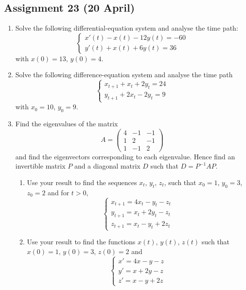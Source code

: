 \documentclass[a4paper]{article}
\begin{document}
\subsection*{Assignment 23 (20 April)}

\begin{enumerate}



\item Solve the following differential-equation system and analyse the time path:
\[
\begin{cases}
x'(t)-x(t)-12y(t)=-60 \\
y'(t)+x(t)+6y(t)=36
\end{cases}
\]
with $x(0)=13$, $y(0)=4$.

\item  Solve the following difference-equation system and analyse the time path
\[
\begin{cases}
x_{t+1}+x_t+2y_t=24 \\
y_{t+1}+2x_t-2y_t=9
\end{cases}
\]
 with $x_0=10$, $y_0=9$.

\item  Find the eigenvalues of the matrix
\[
A=\begin{pmatrix}
4 & -1 & -1 \\
1 & 2 & -1 \\
1 & -1 & 2
\end{pmatrix}
\]
and find the eigenvectors corresponding to each eigenvalue. Hence find an invertible matrix $P$  and a diagonal matrix $D$ such that $D=P^{-1}AP$.

\begin{enumerate}
\item  Use your result to find the sequences $x_t$, $y_t$, $z_t$, such that $x_0=1$, $y_0=3$, $z_0=2$ and for $t>0$,
\[
\begin{cases}
x_{t+1}=4x_t-y_t-z_t \\
y_{t+1}=x_t+2y_t-z_t \\
z_{t+1}=x_t-y_t+2z_t
\end{cases}
\]


\item Use your result to find the functions $x(t)$, $y(t)$, $z(t)$  such that
$x(0)=1$, $y(0)=3$, $z(0)=2$ and
\[
\begin{cases}
x'=4x-y-z \\
y'=x+2y-z \\
z'=x-y+2z
\end{cases}
\]




\end{enumerate}
\end{enumerate}
\end{document}
